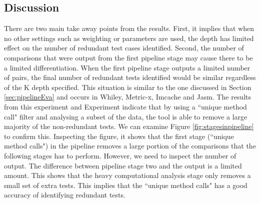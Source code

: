 \subsection{Discussion}
There are two main take away points from the results. First, it implies that when no other settings such as weighting or parameters are used, the depth has limited effect on the number of redundant test cases identified. Second, the number of comparisons that were output from the first pipeline stage may cause there to be a limited differentiation. When the first pipeline stage outputs a limited number of pairs, the final number of redundant tests identified would be similar regardless of the K depth specified. This situation is similar to the one discussed in Section \ref{sec:pipelineEva} and occurs in Whiley, Metric-x, Imcache and Jasm. The results from this experiment and Experiment  indicate that by using a ``unique method call" filter and analysing a subset of the data, the tool is able to remove a large majority of the non-redundant tests. We can examine Figure \ref{fig:stagesinpipeline} to confirm this. Inspecting the figure, it shows that the first stage (``unique method calls") in the pipeline removes a large portion of the comparisons that the following stages has to perform. However, we need to inspect the number of output. The difference between pipeline stage two and the output is a limited amount. This shows that the heavy computational analysis stage only removes a small set of extra tests. This implies that the ``unique method calls" has a good accuracy of identifying redundant tests.

